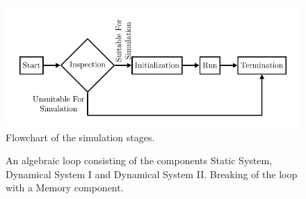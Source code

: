 \documentclass{juliacon}
\begin{document}
\begin{figure}
    \centering
    \includegraphics[width=\linewidth]{figures/FlowChart/flowchart.pdf}
    \caption{Flowchart of the simulation stages.}
    \label{fig: flowchart}
\end{figure}

\begin{figure}
    \centering
    \caption{\protect{} An algebraic loop consisting of the components Static System, Dynamical System I and Dynamical System II. \protect{} Breaking of the loop with a Memory component. }
    \label{fig: algebraic loop}
\end{figure}
\end{document}

